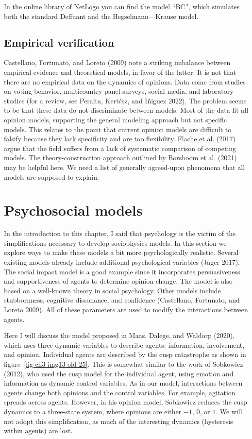 \documentclass[
  a4paper,
  DIV=11,
  numbers=noendperiod,
  oneside]{scrreprt}
\begin{document}
In the online library of NetLogo you can find the model ``BC'', which
simulates both the standard Deffuant and the Hegselmann---Krause model.

\subsection{Empirical verification}\label{sec-Empirical-verification}

Castellano, Fortunato, and Loreto (2009) note a striking imbalance
between empirical evidence and theoretical models, in favor of the
latter. It is not that there are no empirical data on the dynamics of
opinions. Data come from studies on voting behavior, multicountry panel
surveys, social media, and laboratory studies (for a review, see
Peralta, Kertész, and Iñiguez 2022). The problem seems to be that these
data do not discriminate between models. Most of the data fit all
opinion models, supporting the general modeling approach but not
specific models. This relates to the point that current opinion models
are difficult to falsify because they lack specificity and are too
flexibility. Flache et al. (2017) argue that the field suffers from a
lack of systematic comparison of competing models. The
theory-construction approach outlined by Borsboom et al. (2021) may be
helpful here. We need a list of generally agreed-upon phenomena that all
models are supposed to explain.

\section{Psychosocial models}\label{sec-Psychosocial-models}

In the introduction to this chapter, I said that psychology is the
victim of the simplifications necessary to develop sociophysics models.
In this section we explore ways to make these models a bit more
psychologically realistic. Several existing models already include
additional psychological variables (Jager 2017). The social impact model
is a good example since it incorporates persuasiveness and
supportiveness of agents to determine opinion change. The model is also
based on a well-known theory in social psychology. Other models include
stubbornness, cognitive dissonance, and confidence (Castellano,
Fortunato, and Loreto 2009). All of these parameters are used to modify
the interactions between agents.

Here I will discuss the model proposed in Maas, Dalege, and Waldorp
(2020), which uses three dynamic variables to describe agents:
information, involvement, and opinion. Individual agents are described
by the cusp catastrophe as shown in figure~\ref{fig-ch3-img13-old-25}.
This is somewhat similar to the work of Sobkowicz (2012), who used the
cusp model for the individual agent, using emotion and information as
dynamic control variables. As in our model, interactions between agents
change both opinions and the control variables. For example, agitation
spreads across agents. However, in his opinion model, Sobkowicz reduces
the cusp dynamics to a three-state system, where opinions are either
\(-1\), \(0\), or \(1\). We will not adopt this simplification, as much
of the interesting dynamics (hysteresis within agents) are lost.
\end{document}
